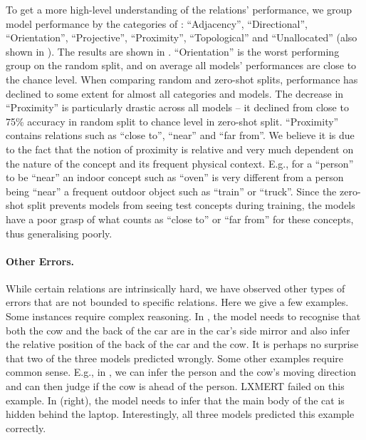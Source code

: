 To get a more high-level understanding of the relations' performance, we group model performance by the categories of \citet{marchi2021cross}: ``Adjacency'', ``Directional'', ``Orientation'', ``Projective'', ``Proximity'', ``Topological'' and ``Unallocated'' (also shown in ). The results are shown in . ``Orientation'' is the worst performing group on the random split, and on average all models' performances are close to the chance level. When comparing random and zero-shot splits, performance has declined to some extent for almost all categories and models.
The decrease in ``Proximity'' is particularly drastic across all models -- it declined from close to 75\% accuracy in random split to chance level in zero-shot split. ``Proximity'' contains relations such as ``close to'', ``near'' and ``far from''. We believe it is due to the fact that the notion of proximity is relative and very much dependent on the nature of the concept and its frequent physical context. E.g., for a ``person'' to be ``near'' an indoor concept such as ``oven'' is very different from a person being ``near'' a frequent outdoor object such as ``train'' or ``truck''. Since the zero-shot split prevents models from seeing test concepts during training, the models have a poor grasp of what counts as ``close to'' or ``far from'' for these concepts, thus generalising poorly.





\paragraph{Other Errors.} While certain relations are intrinsically hard, we have observed other types of errors that are not bounded to specific relations. Here we give a few examples. Some instances require complex reasoning. In , the model needs to recognise that both the cow and the back of the car are in the car's side mirror and also infer the relative position of the back of the car and the cow. It is perhaps no surprise that two of the three models predicted wrongly. Some other examples require common sense. E.g., in , we can infer the person and the cow's moving direction and can then judge if the cow is ahead of the person. 
LXMERT failed on this example. 
In  (right), the model needs to infer that the main body of the cat is hidden behind the laptop. Interestingly, all three models predicted this example correctly.


